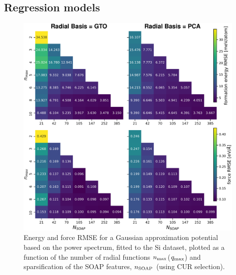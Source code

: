 \subsection{Regression models}


\begin{figure}[b]
    \centering
        \includegraphics[width=\linewidth]{fig/optbasis/si-nmax_vs_feat-rs-cur-combo.pdf}
    \caption{Energy and force RMSE for a Gaussian approximation potential based on the power spectrum, fitted to the Si dataset, plotted as a function of the number of radial functions $n_\mathrm{max}$($q_\mathrm{max}$) and sparsification of the SOAP features, ${n_\mathrm{SOAP}}$ (using CUR selection).}
    \label{fig:si-nmax_vs_feat-rs-rmse}
\end{figure}

